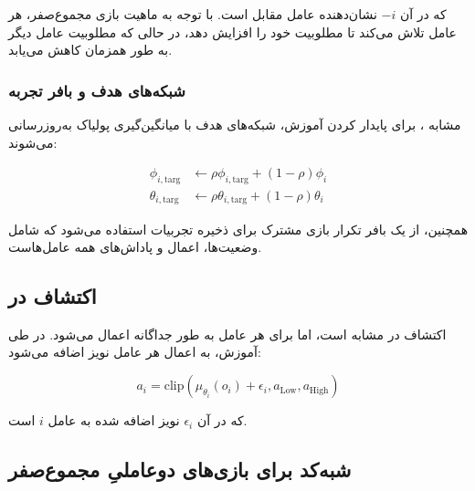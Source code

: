 که در آن $-i$ نشان‌دهنده عامل مقابل است. با توجه به ماهیت بازی مجموع­‌صفر، هر عامل تلاش می‌کند تا مطلوبیت خود را افزایش دهد، در حالی که مطلوبیت عامل دیگر به طور همزمان کاهش می‌یابد.

\subsubsection{شبکه‌های هدف و بافر تجربه}

مشابه ، برای پایدار کردن آموزش، شبکه‌های هدف با میانگین‌گیری پولیاک به‌روزرسانی می‌شوند:

\begin{align*}
    \phi_{i,\text{targ}} &\leftarrow \rho \phi_{i,\text{targ}} + (1 - \rho) \phi_i \\
    \theta_{i,\text{targ}} &\leftarrow \rho \theta_{i,\text{targ}} + (1 - \rho) \theta_i
\end{align*}

همچنین، از یک بافر تکرار بازی مشترک برای ذخیره تجربیات استفاده می‌شود که شامل وضعیت‌ها، اعمال و پاداش‌های همه عامل‌هاست.

\subsection{اکتشاف در }

اکتشاف در  مشابه  است، اما برای هر عامل به طور جداگانه اعمال می‌شود. در طی آموزش، به اعمال هر عامل نویز اضافه می‌شود:

\begin{equation}
    a_i = \text{clip}(\mu_{\theta_i}(o_i) + \epsilon_i, a_{\text{Low}}, a_{\text{High}})
\end{equation}

که در آن $\epsilon_i$ نویز اضافه شده به عامل $i$ است.

\subsection{شبه‌کد  برای بازی‌های دو­عاملیِ مجموع­‌صفر}

